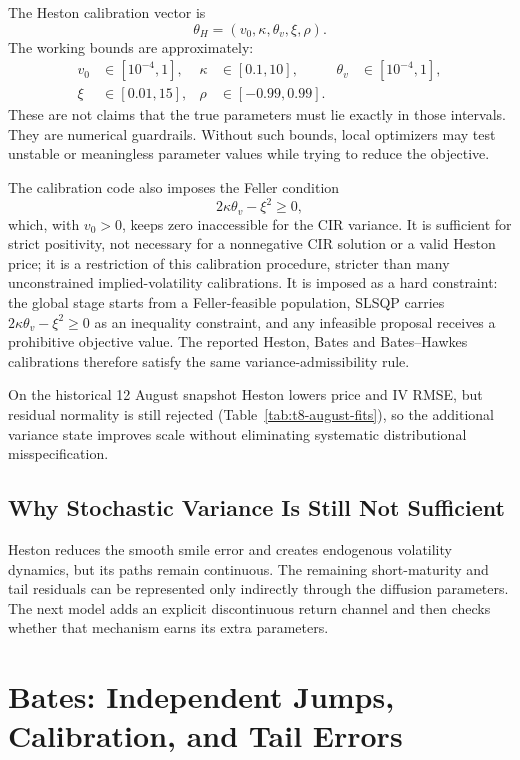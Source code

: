The Heston calibration vector is
\[
    \theta_H=(v_0,\kappa,\theta_v,\xi,\rho).
\]
The working bounds are approximately:
\begin{align}
    v_0 &\in [10^{-4},1],&
    \kappa &\in [0.1,10],&
    \theta_v &\in [10^{-4},1],\\
    \xi &\in [0.01,15],&
    \rho &\in [-0.99,0.99].
\end{align}
These are not claims that the true parameters must lie exactly in those intervals. They are numerical guardrails. Without such bounds, local optimizers may test unstable or meaningless parameter values while trying to reduce the objective.

The calibration code also imposes the Feller condition
\begin{equation}
    2\kappa\theta_v-\xi^2\geq0,
\end{equation}
which, with \(v_0>0\), keeps zero inaccessible for the CIR variance. It is sufficient for strict positivity, not necessary for a nonnegative CIR solution or a valid Heston price; it is a restriction of this calibration procedure, stricter than many unconstrained implied-volatility calibrations. It is imposed as a hard constraint: the global stage starts from a Feller-feasible population, SLSQP carries \(2\kappa\theta_v-\xi^2\geq0\) as an inequality constraint, and any infeasible proposal receives a prohibitive objective value. The reported Heston, Bates and Bates--Hawkes calibrations therefore satisfy the same variance-admissibility rule.

On the historical 12 August snapshot Heston lowers price and IV RMSE, but residual normality is still rejected (Table~\ref{tab:t8-august-fits}), so the additional variance state improves scale without eliminating systematic distributional misspecification.


\subsection{Why Stochastic Variance Is Still Not Sufficient}

Heston reduces the smooth smile error and creates endogenous volatility dynamics, but its paths remain continuous. The remaining short-maturity and tail residuals can be represented only indirectly through the diffusion parameters. The next model adds an explicit discontinuous return channel and then checks whether that mechanism earns its extra parameters.

\section{Bates: Independent Jumps, Calibration, and Tail Errors}
\label{sec:bates-calibration}

